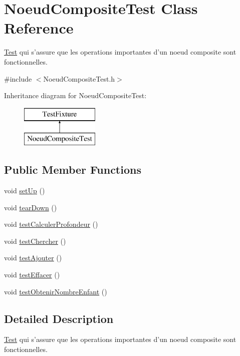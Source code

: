 \hypertarget{class_noeud_composite_test}{\section{Noeud\-Composite\-Test Class Reference}
\label{class_noeud_composite_test}
}


\hyperlink{class_test}{Test} qui s'assure que les operations importantes d'un noeud composite sont fonctionnelles.  




{\ttfamily \#include $<$Noeud\-Composite\-Test.\-h$>$}

Inheritance diagram for Noeud\-Composite\-Test\-:\begin{figure}[H]
\begin{center}
\leavevmode
\includegraphics[height=2.000000cm]{class_noeud_composite_test}
\end{center}
\end{figure}
\subsection*{Public Member Functions}
\begin{DoxyCompactItemize}
\item 
void \hyperlink{group__inf2990_gac580ba74910c8d4e8476ce2f4e1930a2}{set\-Up} ()
\item 
void \hyperlink{group__inf2990_gaab8590913d1e0ce48d52ca2875c12c92}{tear\-Down} ()
\item 
void \hyperlink{group__inf2990_ga1b1070558ee915655b38348147c96f11}{test\-Calculer\-Profondeur} ()
\item 
void \hyperlink{group__inf2990_ga684b84f99cf5a559386a96b8c4468683}{test\-Chercher} ()
\item 
void \hyperlink{group__inf2990_gaaeb7bf3f97cb196df2398cdf1a639469}{test\-Ajouter} ()
\item 
void \hyperlink{group__inf2990_ga2f7f5a6ba30a148469a30a8c32a8690c}{test\-Effacer} ()
\item 
void \hyperlink{group__inf2990_ga756e97f908890526dfe10d4d6a907bec}{test\-Obtenir\-Nombre\-Enfant} ()
\end{DoxyCompactItemize}


\subsection{Detailed Description}
\hyperlink{class_test}{Test} qui s'assure que les operations importantes d'un noeud composite sont fonctionnelles. 

